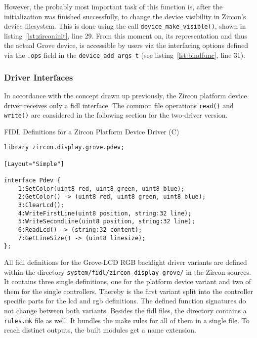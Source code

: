 However, the probably most important task of this function is, after the initialization was finished successfully, to change the device visibility in Zircon's device filesystem.
This is done using the call \texttt{device_make_visible()}, shown in listing~\ref{lst:zirconinit}, line 29.
From this moment on, its representation and thus the actual Grove device, is accessible by users via the interfacing options defined via the \texttt{.ops} field in the \texttt{device_add_args_t} (see listing~\ref{lst:bindfunc}, line 31).

\subsubsection{Driver Interfaces}
In accordance with the concept drawn up previously, the Zircon platform device driver receives only a \ac{fidl} interface.
The common file operations \texttt{read()} and \texttt{write()} are considered in the following section for the two-driver version.
%
\begin{listing} [H]
    \caption{FIDL Definitions for a Zircon Platform Device Driver (C)}
\label{lst:fidldef}
\begin{verbatim}
library zircon.display.grove.pdev;

[Layout="Simple"]

interface Pdev {
    1:SetColor(uint8 red, uint8 green, uint8 blue);
    2:GetColor() -> (uint8 red, uint8 green, uint8 blue);
    3:ClearLcd();
    4:WriteFirstLine(uint8 position, string:32 line);
    5:WriteSecondLine(uint8 position, string:32 line);
    6:ReadLcd() -> (string:32 content);
    7:GetLineSize() -> (uint8 linesize);
};
\end{verbatim}
\end{listing}
%
All \ac{fidl} definitions for the Grove-LCD RGB backlight driver variants are defined within the directory \texttt{system/fidl/zircon-display-grove/} in the Zircon sources.
It contains three single definitions, one for the platform device variant and two of them for the single controllers.
Thereby is the first variant split into the controller specific parts for the \ac{lcd} and \ac{rgb} definitions.
The defined function signatures do not change between both variants.
Besides the \ac{fidl} files, the directory contains a \texttt{rules.mk} file as well.
It bundles the make rules for all of them in a single file.
To reach distinct outputs, the built modules get a name extension.
